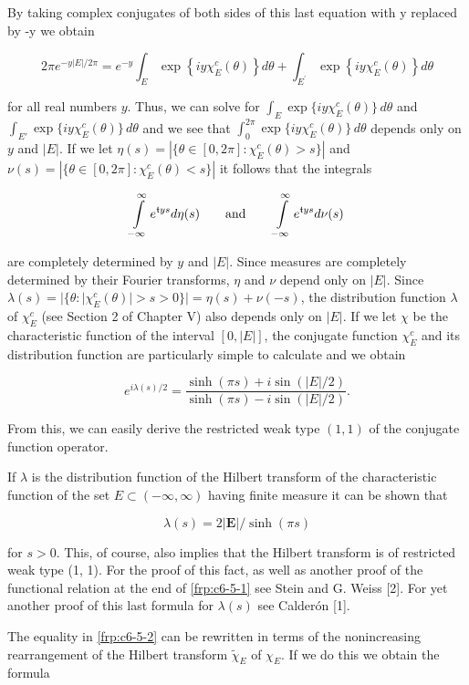 By taking complex conjugates of both sides of this last equation with y replaced by -y we obtain

\[
2\pi e^{-y|E|/2\pi}=e^{-y}\int_{E}\exp\left\{i y\chi_{E}^{c}(\theta)\right\}d\theta+\int_{E^{\prime}}\exp\left\{i y\chi_{E}^{c}(\theta)\right\}d\theta
\]

for all real numbers $y$. Thus, we can solve for $\int_E \exp \{iy\chi_E^c(\theta)\} \, d\theta$ and $\int_{E'} \exp \{iy\chi_E^c(\theta)\} \, d\theta$ and we see that $\int_0^{2\pi} \exp \{iy\chi_E^c(\theta)\} \, d\theta$ depends only on $y$ and $|E|$. If we let $\eta(s) = |\{\theta \in [0, 2\pi]: \chi_E^c(\theta) > s\}|$ and $\nu(s) = |\{\theta \in [0, 2\pi]: \chi_E^c(\theta) < s\}|$ it follows that the integrals

\[
\intop_{-\infty}^{\infty}e^{\mathfrak{t}y s}d\eta(s)\qquad\text{and}\qquad\intop_{-\infty}^{\infty}e^{\mathfrak{t}y s}d\nu(s)
\]

are completely determined by $y$ and $|E|$. Since measures are completely determined by their Fourier transforms, $\eta$ and $\nu$ depend only on $|E|$. Since $\lambda(s) = |\{\theta: |\chi_E^c(\theta)| > s > 0\}| = \eta(s) + \nu(-s)$, the distribution function $\lambda$ of $\chi_E^c$ (see Section 2 of Chapter V) also depends only on $|E|$. If we let $\chi$ be the characteristic function of the interval $[0, |E|]$, the conjugate function $\chi_E^c$ and its distribution function are particularly simple to calculate and we obtain

\[
e^{i\lambda(s)/2}=\frac{\sinh(\pi s)+i\sin(|E|/2)}{\sinh(\pi s)-i\sin(|E|/2)}.
\]

From this, we can easily derive the restricted weak type $(1,1)$ of the conjugate function operator.

 If $\lambda$ is the distribution function of the Hilbert transform of the characteristic function of the set $E \subset (-\infty, \infty)$ having finite measure it can be shown that

\[
\lambda(s)=2\left|\boldsymbol{E}\right|/\sinh\left(\pi s\right)
\]

for $s > 0$. This, of course, also implies that the Hilbert transform is of restricted weak type (1, 1). For the proof of this fact, as well as another proof of the functional relation at the end of \eqref{frp:c6-5-1} see Stein and G. Weiss [2]. For yet another proof of this last formula for $\lambda(s)$ see Calderón [1].

 The equality in \eqref{frp:c6-5-2} can be rewritten in terms of the nonincreasing rearrangement of the Hilbert transform $\tilde{\chi}_{E}$ of $\chi_{E}$. If we do this we obtain the formula

